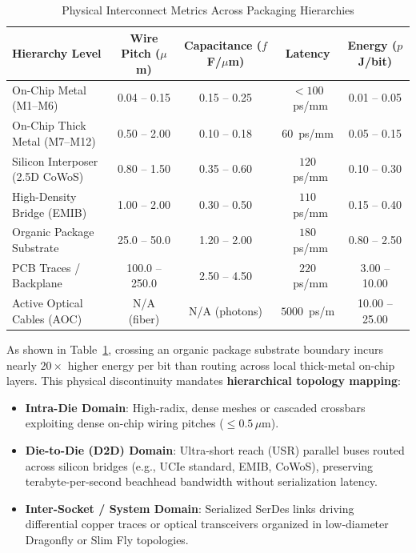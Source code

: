 \begin{table}[htbp]
\centering
\caption{Physical Interconnect Metrics Across Packaging Hierarchies}
\label{tab:ch4_packaging_metrics}
\begin{tabular}{lcccc}
\toprule
\textbf{Hierarchy Level} & \textbf{Wire Pitch ($\mu$m)} & \textbf{Capacitance ($f$F/$\mu$m)} & \textbf{Latency} & \textbf{Energy ($p$J/bit)} \\
\midrule
On-Chip Metal (M1--M6)     & 0.04 -- 0.15 & 0.15 -- 0.25 & $< 100$~ps/mm & 0.01 -- 0.05 \\
On-Chip Thick Metal (M7--M12) & 0.50 -- 2.00 & 0.10 -- 0.18 & $60$~ps/mm   & 0.05 -- 0.15 \\
Silicon Interposer (2.5D CoWoS) & 0.80 -- 1.50 & 0.35 -- 0.60 & $120$~ps/mm  & 0.10 -- 0.30 \\
High-Density Bridge (EMIB) & 1.00 -- 2.00 & 0.30 -- 0.50 & $110$~ps/mm  & 0.15 -- 0.40 \\
Organic Package Substrate   & 25.0 -- 50.0 & 1.20 -- 2.00 & $180$~ps/mm  & 0.80 -- 2.50 \\
PCB Traces / Backplane      & 100.0 -- 250.0 & 2.50 -- 4.50 & $220$~ps/mm  & 3.00 -- 10.00 \\
Active Optical Cables (AOC) & N/A (fiber)  & N/A (photons)& $5000$~ps/m  & 10.00 -- 25.00 \\
\bottomrule
\end{tabular}
\end{table}

As shown in Table~\ref{tab:ch4_packaging_metrics}, crossing an organic package substrate boundary incurs nearly $20\times$ higher energy per bit than routing across local thick-metal on-chip layers. This physical discontinuity mandates \textbf{hierarchical topology mapping}:
\begin{itemize}
    \item \textbf{Intra-Die Domain}: High-radix, dense meshes or cascaded crossbars exploiting dense on-chip wiring pitches ($\le 0.5\,\mu\text{m}$).
    \item \textbf{Die-to-Die (D2D) Domain}: Ultra-short reach (USR) parallel buses routed across silicon bridges (e.g., UCIe standard, EMIB, CoWoS), preserving terabyte-per-second beachhead bandwidth without serialization latency.
    \item \textbf{Inter-Socket / System Domain}: Serialized SerDes links driving differential copper traces or optical transceivers organized in low-diameter Dragonfly or Slim Fly topologies.
\end{itemize}

